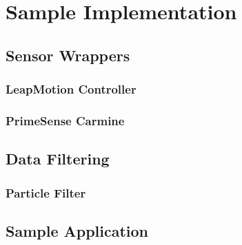 \chapter{Sample Implementation}\label{chap:sample_app}
\section{Sensor Wrappers}
\subsection{LeapMotion Controller}
\subsection{PrimeSense Carmine}
\section{Data Filtering}\label{sec:fuser_impl}
\subsection{Particle Filter}\label{sec:filer_impl}
\section{Sample Application}\label{sec:app_impl}